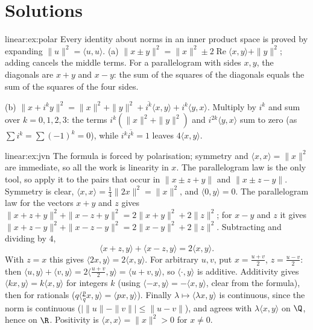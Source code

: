 \section{Solutions}

\begin{solution}{linear:ex:polar}
\idea Every identity about norms in an inner product space is proved by expanding $\|u\|^2=\langle u,u\rangle$.
\writeup (a) $\|x\pm y\|^2=\|x\|^2\pm2\operatorname{Re}\langle x,y\rangle+\|y\|^2$; adding cancels the middle terms. For a
parallelogram with sides $x,y$, the diagonals are $x+y$ and $x-y$: the sum of the squares of the diagonals equals the sum
of the squares of the four sides.

(b) $\|x+i^ky\|^2=\|x\|^2+\|y\|^2+\overline{i^k}\langle x,y\rangle+i^k\langle y,x\rangle$. Multiply by $i^k$ and sum over
$k=0,1,2,3$: the terms $i^k(\|x\|^2+\|y\|^2)$ and $i^{2k}\langle y,x\rangle$ sum to zero (as $\sum i^k=\sum(-1)^k=0$),
while $i^k\overline{i^k}=1$ leaves $4\langle x,y\rangle$.
\end{solution}

\begin{solution}{linear:ex:jvn}
\idea The formula is forced by polarisation; symmetry and $\langle x,x\rangle=\|x\|^2$ are immediate, so all the work is
linearity in $x$. The parallelogram law is the only tool, so apply it to the pairs that occur in
$\|x\pm z+y\|$ and $\|x\pm z-y\|$.
\writeup Symmetry is clear, $\langle x,x\rangle=\frac14\|2x\|^2=\|x\|^2$, and $\langle0,y\rangle=0$. The parallelogram
law for the vectors $x+y$ and $z$ gives $\|x+z+y\|^2+\|x-z+y\|^2=2\|x+y\|^2+2\|z\|^2$; for $x-y$ and $z$ it gives
$\|x+z-y\|^2+\|x-z-y\|^2=2\|x-y\|^2+2\|z\|^2$. Subtracting and dividing by $4$,
\[
\langle x+z,y\rangle+\langle x-z,y\rangle=2\langle x,y\rangle.
\]
With $z=x$ this gives $\langle2x,y\rangle=2\langle x,y\rangle$. For arbitrary $u,v$, put $x=\frac{u+v}2$, $z=\frac{u-v}2$:
then $\langle u,y\rangle+\langle v,y\rangle=2\langle\frac{u+v}2,y\rangle=\langle u+v,y\rangle$, so $\langle\cdot,y\rangle$
is additive. Additivity gives $\langle kx,y\rangle=k\langle x,y\rangle$ for integers $k$ (using $\langle-x,y\rangle=-\langle
x,y\rangle$, clear from the formula), then for rationals ($q\langle\frac pqx,y\rangle=\langle px,y\rangle$). Finally
$\lambda\mapsto\langle\lambda x,y\rangle$ is continuous, since the norm is continuous ($|\|u\|-\|v\||\le\|u-v\|$), and agrees
with $\lambda\langle x,y\rangle$ on $\Q$, hence on $\R$. Positivity is $\langle x,x\rangle=\|x\|^2>0$ for $x\ne0$.
\end{solution}

